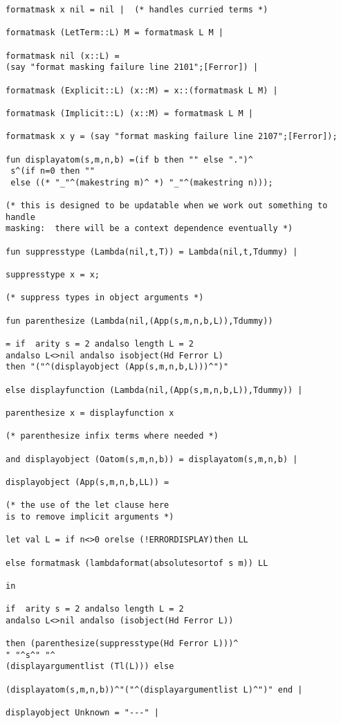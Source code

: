 \documentclass[12pt]{article}
\begin{document}
\begin{verbatim}
formatmask x nil = nil |  (* handles curried terms *)

formatmask (LetTerm::L) M = formatmask L M |

formatmask nil (x::L) = 
(say "format masking failure line 2101";[Ferror]) |

formatmask (Explicit::L) (x::M) = x::(formatmask L M) |

formatmask (Implicit::L) (x::M) = formatmask L M |

formatmask x y = (say "format masking failure line 2107";[Ferror]);

fun displayatom(s,m,n,b) =(if b then "" else ".")^
 s^(if n=0 then "" 
 else ((* "_"^(makestring m)^ *) "_"^(makestring n)));

(* this is designed to be updatable when we work out something to handle
masking:  there will be a context dependence eventually *)

fun suppresstype (Lambda(nil,t,T)) = Lambda(nil,t,Tdummy) |

suppresstype x = x;

(* suppress types in object arguments *)

fun parenthesize (Lambda(nil,(App(s,m,n,b,L)),Tdummy))

= if  arity s = 2 andalso length L = 2
andalso L<>nil andalso isobject(Hd Ferror L)
then "("^(displayobject (App(s,m,n,b,L)))^")"

else displayfunction (Lambda(nil,(App(s,m,n,b,L)),Tdummy)) |

parenthesize x = displayfunction x

(* parenthesize infix terms where needed *)

and displayobject (Oatom(s,m,n,b)) = displayatom(s,m,n,b) |

displayobject (App(s,m,n,b,LL)) = 

(* the use of the let clause here
is to remove implicit arguments *)

let val L = if n<>0 orelse (!ERRORDISPLAY)then LL

else formatmask (lambdaformat(absolutesortof s m)) LL

in

if  arity s = 2 andalso length L = 2
andalso L<>nil andalso (isobject(Hd Ferror L))

then (parenthesize(suppresstype(Hd Ferror L)))^
" "^s^" "^
(displayargumentlist (Tl(L))) else

(displayatom(s,m,n,b))^"("^(displayargumentlist L)^")" end |

displayobject Unknown = "---" |


\end{verbatim}
\end{document}
